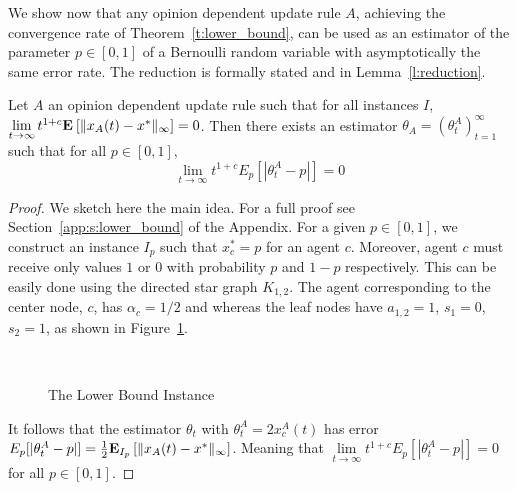 We show now that any opinion dependent update rule $A$, achieving the
convergence rate of Theorem~\ref{t:lower_bound}, can be used as an
estimator of the parameter $p \in [0,1]$ of a Bernoulli random variable with
asymptotically the same error rate.
The reduction is formally stated and in Lemma~\ref{l:reduction}.
\begin{lemma}\label{l:reduction}
  Let $A$ an opinion dependent update rule such that for all instances $I$,
  $\lim \limits_{t \rightarrow \infty} t^{1+c}
  \bm{\mathrm{E}}_{} \left[ \| x_A(t)-x^* \|_{\infty} \right]=0$.
  Then there exists an estimator $\theta_A=(\theta_t^A)_{t=1}^\infty$ such that for all
  $p \in [0,1]$,
  \[\lim_{t \rightarrow \infty}t^{1+c}E_p[|\theta_t^A-p|]=0\]
\end{lemma}
\begin{proof}
  We sketch here the main idea. For a full proof see Section~\ref{app:s:lower_bound}
  of the Appendix.  For a given $p \in [0,1]$, we construct an instance $I_p$ such that
  $x_c^*=p$ for an agent $c$. Moreover, agent $c$ must
  receive only values $1$ or $0$ with probability $p$ and $1-p$ respectively.
  This can be easily done using the directed star graph $K_{1,2}$.
  The agent corresponding to the center node, $c$, has $\alpha_c = 1/2$ and
  whereas the leaf nodes have $a_{1,2} = 1$, $s_1 = 0$, $s_2 = 1$,
  as shown in Figure~\ref{fig:lb_instance}.
  \begin{figure}\
    \centering

    \caption{The Lower Bound Instance} \label{fig:lb_instance}
  \end{figure}
  It follows that the estimator $\theta_t$ with $\theta_t^A = 2x_c^A(t)$
  has error $E_p[|\theta_t^A-p|]=\frac{1}{2}\bm{\mathrm{E}}_{I_p} \left[ \| x_A(t)-x^* \|_{\infty} \right]$.
  Meaning that $\lim\limits_{t \rightarrow \infty}t^{1+c}E_p[|\theta_t^A -p|]=0$ for all
  $p \in [0,1]$.
\end{proof}

